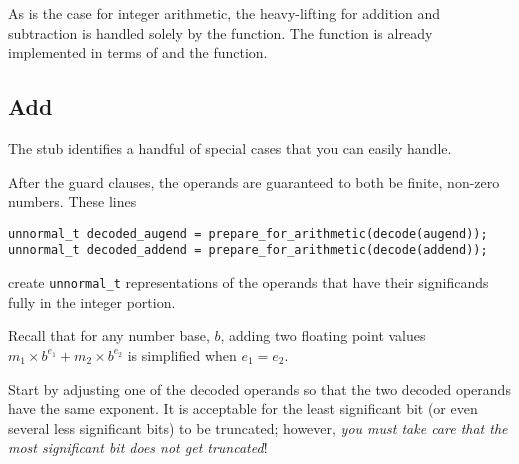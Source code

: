 As is the case for integer arithmetic, the heavy-lifting for addition and subtraction is handled solely by the  function.
The  function is already implemented in terms of  and the  function.

\subsection{Add}

The  stub identifies a handful of special cases that you can easily handle.
\begin{description}
\end{description}

After the guard clauses, the operands are guaranteed to both be finite, non-zero numbers.
These lines
\begin{lstlisting}
unnormal_t decoded_augend = prepare_for_arithmetic(decode(augend));
unnormal_t decoded_addend = prepare_for_arithmetic(decode(addend));
\end{lstlisting}
create \lstinline{unnormal_t} representations of the operands that have their significands fully in the integer portion.

Recall that for any number base, $b$, adding two floating point values $m_1 \times b^{e_1} + m_2 \times b^{e_2}$ is simplified when $e_1 = e_2$.

Start by adjusting one of the decoded operands so that the two decoded operands have the same exponent.
It is acceptable for the least significant bit (or even several less significant bits) to be truncated;
however, \textit{you must take care that the most significant bit does not get truncated}!


